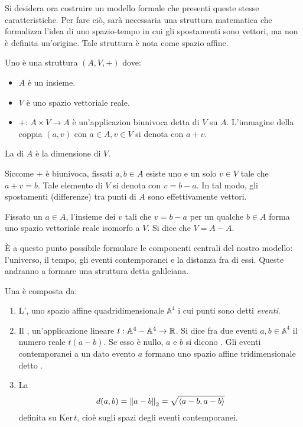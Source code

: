 Si desidera ora costruire un modello formale che presenti queste stesse caratteristiche. Per fare ciò, sarà necessaria una struttura matematica che formalizza l'idea di uno spazio-tempo in cui gli spostamenti sono vettori, ma non è definita un'origine. Tale struttura è nota come spazio affine.
\begin{definition}
  Uno  è una struttura $(A,V,+)$ dove:
  \begin{itemize}
    \item $A$ è un insieme.
    \item $V$ è uno spazio vettoriale reale.
    \item $+:\, A\times V \to A$ è un'applicazion biunivoca detta  di $V$ su $A$. L'immagine della coppia $(a,v)$ con $a \in  A, v \in V$ si denota con $a+v$.
  \end{itemize}
  La  di $A$ è la dimensione di $V$.
\end{definition}
\begin{remark}
  Siccome $+$ è biunivoca, fissati $a,b \in A$ esiste uno e un solo $v \in V$ tale che $a + v = b$. Tale elemento di $V$ si denota con $v = b - a$. In tal modo, gli spostamenti (differenze) tra punti di $A$ sono effettivamente vettori.
\end{remark}
\begin{remark}
Fissato un $a \in A$, l'insieme dei $v$ tali che $v = b - a$ per un qualche $b \in A$ forma uno spazio vettoriale reale isomorfo a $V$. Si dice che $V = A - A$.
\end{remark}

È a questo punto possibile formulare le componenti centrali del nostro modello: l'universo, il tempo, gli eventi contemporanei e la distanza fra di essi. Queste andranno a formare una struttura detta galileiana.
\begin{definition}
  Una  è composta da:
  \begin{enumerate}
    \item L', uno spazio affine quadridimensionale $\mathbb{A}^4$ i cui punti sono detti \emph{eventi}.
    \item Il , un'applicazione lineare $t:\mathbb{A}^4 - \mathbb{A}^4 \to \mathbb{R}$. Si dice  fra due eventi $a,b \in \mathbb{A}^4$ il numero reale $t(a-b)$. Se esso è nullo, $a$ e $b$ si dicono . Gli eventi contemporanei a un dato evento $a$ formano uno spazio affine tridimensionale detto .
    \item La  \begin{equation*}
    d(a,b) = \norm{a-b}_2 = \sqrt{\ev{a-b,a-b}}  
    \end{equation*}
    definita su $\mathrm{Ker}\, t$, cioè sugli spazi degli eventi contemporanei.
  \end{enumerate}
\end{definition}

